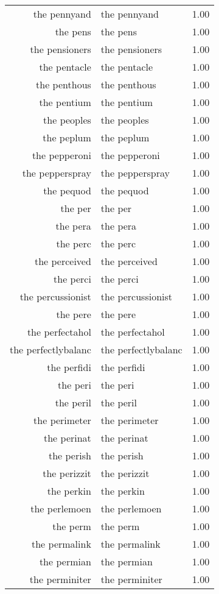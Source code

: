 \begin{table}[ht]
\begin{tabular}{rlr}
  the pennyand & the pennyand & 1.00 \\ 
  the pens & the pens & 1.00 \\ 
  the pensioners & the pensioners & 1.00 \\ 
  the pentacle & the pentacle & 1.00 \\ 
  the penthous & the penthous & 1.00 \\ 
  the pentium & the pentium & 1.00 \\ 
  the peoples & the peoples & 1.00 \\ 
  the peplum & the peplum & 1.00 \\ 
  the pepperoni & the pepperoni & 1.00 \\ 
  the pepperspray & the pepperspray & 1.00 \\ 
  the pequod & the pequod & 1.00 \\ 
  the per & the per & 1.00 \\ 
  the pera & the pera & 1.00 \\ 
  the perc & the perc & 1.00 \\ 
  the perceived & the perceived & 1.00 \\ 
  the perci & the perci & 1.00 \\ 
  the percussionist & the percussionist & 1.00 \\ 
  the pere & the pere & 1.00 \\ 
  the perfectahol & the perfectahol & 1.00 \\ 
  the perfectlybalanc & the perfectlybalanc & 1.00 \\ 
  the perfidi & the perfidi & 1.00 \\ 
  the peri & the peri & 1.00 \\ 
  the peril & the peril & 1.00 \\ 
  the perimeter & the perimeter & 1.00 \\ 
  the perinat & the perinat & 1.00 \\ 
  the perish & the perish & 1.00 \\ 
  the perizzit & the perizzit & 1.00 \\ 
  the perkin & the perkin & 1.00 \\ 
  the perlemoen & the perlemoen & 1.00 \\ 
  the perm & the perm & 1.00 \\ 
  the permalink & the permalink & 1.00 \\ 
  the permian & the permian & 1.00 \\ 
  the perminiter & the perminiter & 1.00 \\ 

\end{tabular}
\end{table}
